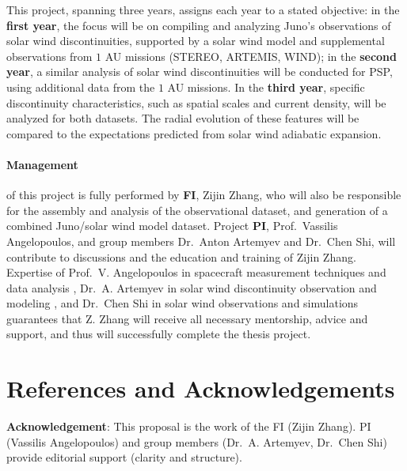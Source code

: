\documentclass[
  letterpaper,
  DIV=11,
  numbers=noendperiod]{scrartcl}
\let\oldparagraph\paragraph
\renewcommand{\paragraph}[1]{\oldparagraph{#1}\mbox{}}
\begin{document}
This project, spanning three years, assigns each year to a stated
objective: in the \textbf{first year}, the focus will be on compiling
and analyzing Juno's observations of solar wind discontinuities,
supported by a solar wind model and supplemental observations from \(1\)
AU missions (STEREO, ARTEMIS, WIND); in the \textbf{second year}, a
similar analysis of solar wind discontinuities will be conducted for
PSP, using additional data from the \(1\) AU missions. In the
\textbf{third year}, specific discontinuity characteristics, such as
spatial scales and current density, will be analyzed for both datasets.
The radial evolution of these features will be compared to the
expectations predicted from solar wind adiabatic expansion.

\paragraph{Management}\label{management}

of this project is fully performed by \textbf{FI}, Zijin Zhang, who will
also be responsible for the assembly and analysis of the observational
dataset, and generation of a combined Juno/solar wind model dataset.
Project \textbf{PI}, Prof.~Vassilis Angelopoulos, and group members
Dr.~Anton Artemyev and Dr.~Chen Shi, will contribute to discussions and
the education and training of Zijin Zhang. Expertise of Prof.~V.
Angelopoulos in spacecraft measurement techniques and data analysis
\cite{Angelopoulos19,Angelopoulos11:ARTEMIS}, Dr.~A. Artemyev in solar
wind discontinuity observation and modeling
\citep{Artemyev18:apj,Artemyev19:jgr:solarwind}, and Dr.~Chen Shi in
solar wind observations and simulations
\citep{ChenShi21:a&a,ChenShi22:apj,ChenShi23:apj} guarantees that Z.
Zhang will receive all necessary mentorship, advice and support, and
thus will successfully complete the thesis project.

\section{References and
Acknowledgements}\label{references-and-acknowledgements}

\renewcommand{\bibsection}{}


\textbf{Acknowledgement}: This proposal is the work of the FI (Zijin
Zhang). PI (Vassilis Angelopoulos) and group members (Dr.~A. Artemyev,
Dr.~Chen Shi) provide editorial support (clarity and structure).
\end{document}
